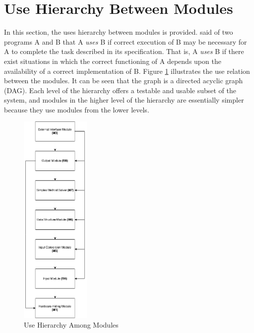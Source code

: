 \documentclass[12pt, titlepage]{article}
\begin{document}

\section{Use Hierarchy Between Modules} \label{SecUse}

In this section, the uses hierarchy between modules is
provided. \citet{Parnas1978} said of two programs A and B that A {\em uses} B if
correct execution of B may be necessary for A to complete the task described in
its specification. That is, A {\em uses} B if there exist situations in which
the correct functioning of A depends upon the availability of a correct
implementation of B.  Figure \ref{FigUH} illustrates the use relation between
the modules. It can be seen that the graph is a directed acyclic graph
(DAG). Each level of the hierarchy offers a testable and usable subset of the
system, and modules in the higher level of the hierarchy are essentially simpler
because they use modules from the lower levels.

\begin{figure}[H]
\centering
\includegraphics[width=0.3\textwidth]{UsesHierarchy.png}
\caption{Use Hierarchy Among Modules}
\label{FigUH}
\end{figure}
\end{document}
